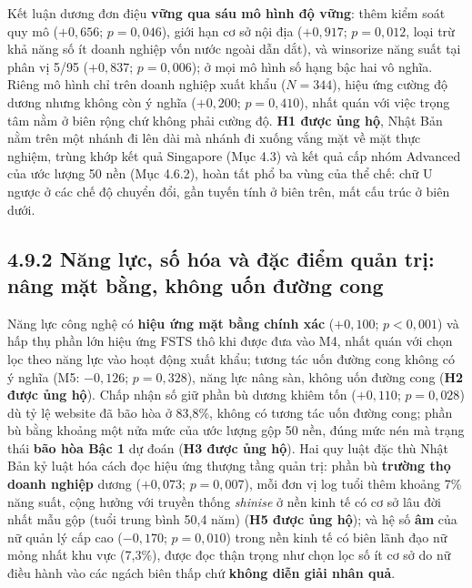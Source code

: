 \documentclass[
  a4paper,
  13pt]{extreport}
\begin{document}
Kết luận dương đơn điệu \textbf{vững qua sáu mô hình độ vững}: thêm kiểm
soát quy mô (\(+0{,}656\); \(p = 0{,}046\)), giới hạn cơ sở nội địa
(\(+0{,}917\); \(p = 0{,}012\), loại trừ khả năng số ít doanh nghiệp vốn
nước ngoài dẫn dắt), và winsorize năng suất tại phân vị 5/95
(\(+0{,}837\); \(p = 0{,}006\)); ở mọi mô hình số hạng bậc hai vô nghĩa.
Riêng mô hình chỉ trên doanh nghiệp xuất khẩu (\(N = 344\)), hiệu ứng
cường độ dương nhưng không còn ý nghĩa (\(+0{,}200\); \(p = 0{,}410\)),
nhất quán với việc trọng tâm nằm ở biên rộng chứ không phải cường độ.
\textbf{H1 được ủng hộ}, Nhật Bản nằm trên một nhánh đi lên dài mà nhánh
đi xuống vắng mặt về mặt thực nghiệm, trùng khớp kết quả Singapore (Mục
4.3) và kết quả cấp nhóm Advanced của ước lượng 50 nền (Mục 4.6.2), hoàn
tất phổ ba vùng của thể chế: chữ U ngược ở các chế độ chuyển đổi, gần
tuyến tính ở biên trên, mất cấu trúc ở biên dưới.

\hypertarget{nux103ng-lux1ef1c-sux1ed1-huxf3a-vuxe0-ux111ux1eb7c-ux111iux1ec3m-quux1ea3n-trux1ecb-nuxe2ng-mux1eb7t-bux1eb1ng-khuxf4ng-uux1ed1n-ux111ux1b0ux1eddng-cong}{%
\subsection{4.9.2 Năng lực, số hóa và đặc điểm quản trị: nâng mặt bằng,
không uốn đường
cong}\label{nux103ng-lux1ef1c-sux1ed1-huxf3a-vuxe0-ux111ux1eb7c-ux111iux1ec3m-quux1ea3n-trux1ecb-nuxe2ng-mux1eb7t-bux1eb1ng-khuxf4ng-uux1ed1n-ux111ux1b0ux1eddng-cong}}

Năng lực công nghệ có \textbf{hiệu ứng mặt bằng chính xác}
(\(+0{,}100\); \(p < 0{,}001\)) và hấp thụ phần lớn hiệu ứng FSTS thô
khi được đưa vào M4, nhất quán với chọn lọc theo năng lực vào hoạt động
xuất khẩu; tương tác uốn đường cong không có ý nghĩa (M5: \(-0{,}126\);
\(p = 0{,}328\)), năng lực nâng sàn, không uốn đường cong (\textbf{H2
được ủng hộ}). Chấp nhận số giữ phần bù dương khiêm tốn (\(+0{,}110\);
\(p = 0{,}028\)) dù tỷ lệ website đã bão hòa ở 83,8\%, không có tương
tác uốn đường cong; phần bù bằng khoảng một nửa mức của ước lượng gộp 50
nền, đúng mức nén mà trạng thái \textbf{bão hòa Bậc 1} dự đoán
(\textbf{H3 được ủng hộ}). Hai quy luật đặc thù Nhật Bản kỷ luật hóa
cách đọc hiệu ứng thượng tầng quản trị: phần bù \textbf{trường thọ doanh
nghiệp} dương (\(+0{,}073\); \(p = 0{,}007\)), mỗi đơn vị log tuổi thêm
khoảng 7\% năng suất, cộng hưởng với truyền thống \emph{shinise} ở nền
kinh tế có cơ sở lâu đời nhất mẫu gộp (tuổi trung bình 50,4 năm)
(\textbf{H5 được ủng hộ}); và hệ số \textbf{âm} của nữ quản lý cấp cao
(\(-0{,}170\); \(p = 0{,}010\)) trong nền kinh tế có biên lãnh đạo nữ
mỏng nhất khu vực (7,3\%), được đọc thận trọng như chọn lọc số ít cơ sở
do nữ điều hành vào các ngách biên thấp chứ \textbf{không diễn giải nhân
quả}.
\end{document}
